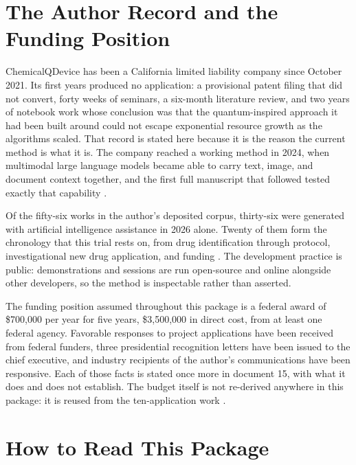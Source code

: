 \section{The Author Record and the Funding Position}

ChemicalQDevice has been a California limited liability company since October
2021. Its first years produced no application: a provisional patent filing that
did not convert, forty weeks of seminars, a six-month literature review, and two
years of notebook work whose conclusion was that the quantum-inspired approach it
had been built around could not escape exponential resource growth as the
algorithms scaled. That record is stated here because it is the reason the
current method is what it is. The company reached a working method in 2024, when
multimodal large language models became able to carry text, image, and document
context together, and the first full manuscript that followed tested exactly
that capability \cite{lmmchem2024}.

Of the fifty-six works in the author's deposited corpus, thirty-six were
generated with artificial intelligence assistance in 2026 alone. Twenty of them
form the chronology that this trial rests on, from drug identification through
protocol, investigational new drug application, and funding
\cite{pdacdeck2026}. The development practice is public: demonstrations and
sessions are run open-source and online alongside other developers, so the
method is inspectable rather than asserted.

The funding position assumed throughout this package is a federal award of
\$700,000 per year for five years, \$3,500,000 in direct cost, from at least one
federal agency. Favorable responses to project applications have been received
from federal funders, three presidential recognition letters have been issued to
the chief executive, and industry recipients of the author's communications have
been responsive. Each of those facts is stated once more in document 15, with
what it does and does not establish. The budget itself is not re-derived
anywhere in this package: it is reused from the ten-application work
\cite{tenapps}.

\section{How to Read This Package}

